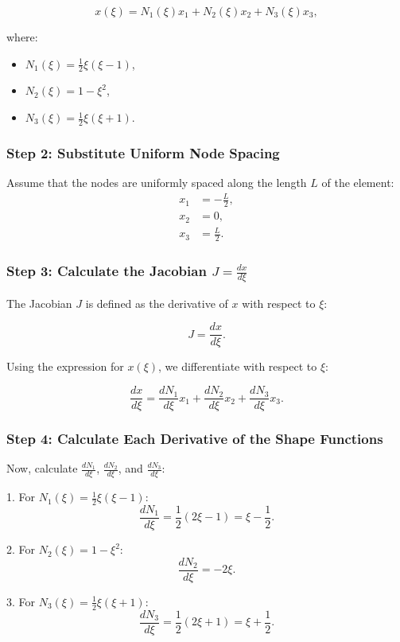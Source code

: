 \documentclass{article}
\begin{document}
\[
x(\xi) = N_1(\xi) x_1 + N_2(\xi) x_2 + N_3(\xi) x_3,
\]

where:
\begin{itemize}
    \item \( N_1(\xi) = \frac{1}{2} \xi (\xi - 1) \),
    \item \( N_2(\xi) = 1 - \xi^2 \),
    \item \( N_3(\xi) = \frac{1}{2} \xi (\xi + 1) \).
\end{itemize}

\subsubsection*{Step 2: Substitute Uniform Node Spacing}
Assume that the nodes are uniformly spaced along the length \( L \) of the element:
\begin{align*}
    x_1 &= -\frac{L}{2}, \\
    x_2 &= 0, \\
    x_3 &= \frac{L}{2}.
\end{align*}

\subsubsection*{Step 3: Calculate the Jacobian \( J = \frac{dx}{d\xi} \)}
The Jacobian \( J \) is defined as the derivative of \( x \) with respect to \( \xi \):

\[
J = \frac{dx}{d\xi}.
\]

Using the expression for \( x(\xi) \), we differentiate with respect to \( \xi \):

\[
\frac{dx}{d\xi} = \frac{dN_1}{d\xi} x_1 + \frac{dN_2}{d\xi} x_2 + \frac{dN_3}{d\xi} x_3.
\]

\subsubsection*{Step 4: Calculate Each Derivative of the Shape Functions}
Now, calculate \( \frac{dN_1}{d\xi} \), \( \frac{dN_2}{d\xi} \), and \( \frac{dN_3}{d\xi} \):

1. For \( N_1(\xi) = \frac{1}{2} \xi (\xi - 1) \):
   \[
   \frac{dN_1}{d\xi} = \frac{1}{2} (2\xi - 1) = \xi - \frac{1}{2}.
   \]

2. For \( N_2(\xi) = 1 - \xi^2 \):
   \[
   \frac{dN_2}{d\xi} = -2\xi.
   \]

3. For \( N_3(\xi) = \frac{1}{2} \xi (\xi + 1) \):
   \[
   \frac{dN_3}{d\xi} = \frac{1}{2} (2\xi + 1) = \xi + \frac{1}{2}.
   \]
\end{document}
